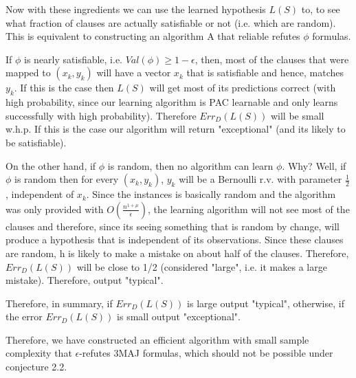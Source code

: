 \documentclass[12pt]{report}
\begin{document}
Now with these ingredients we can use the learned hypothesis $L(S)$ to, to see what fraction of clauses are actually satisfiable or not (i.e. which are random). This is equivalent to constructing an algorithm A that reliable refutes $\phi$ formulas.

If $\phi$ is nearly satisfiable, i.e. $Val(\phi) \geq 1 - \epsilon$, then, most of the clauses that were mapped to $(x_k, y_k)$ will have a vector $x_k$ that is satisfiable and hence, matches $y_k$. If this is the case then $L(S)$ will get most of its predictions correct (with high probability, since our learning algorithm is PAC learnable and only learns successfully with high probability). Therefore $ Err_{D}(L(S)) $ will be small w.h.p. If this is the case our algorithm will return "exceptional" (and its likely to be satisfiable).

On the other hand, if $\phi$ is random, then no algorithm can learn $\phi$. Why? Well, if $\phi$ is random then for every $(x_k, y_k)$, $y_k$ will be a Bernoulli r.v. with parameter $\frac{1}{2}$, independent of $x_k$. Since the instances is basically random and the algorithm was only provided with $O(\frac{n^{1+\mu}}{\epsilon} )$, the learning algorithm will not see most of the clauses and therefore, since its seeing something that is random by change, will produce a hypothesis that is independent of its observations. Since these clauses are random, h is likely to make a mistake on about half of the clauses. Therefore, $Err_{D}(L(S))$ will be close to 1/2 (considered "large", i.e. it makes a large mistake). Therefore, output "typical".

Therefore, in summary, if $Err_{D}(L(S))$ is large output "typical", otherwise, if the error $Err_{D}(L(S))$ is small output "exceptional".

Therefore, we have constructed an efficient algorithm with small sample complexity that $\epsilon$-refutes 3MAJ formulas, which should not be possible under conjecture 2.2.
\end{document}
